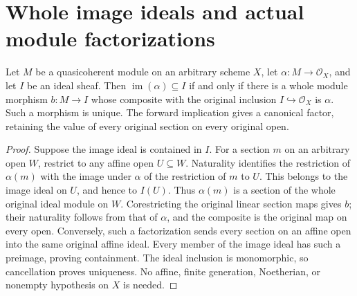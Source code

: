 \section{Whole image ideals and actual module factorizations}

\begin{proposition}
\label{prop:actual-quasicoherent-image-factorization}
Let $M$ be a quasicoherent module on an arbitrary scheme $X$, let
$\alpha:M\to\mathcal O_X$, and let $I$ be an ideal sheaf. Then
$\operatorname{im}(\alpha)\subseteq I$ if and only if there is a whole
module morphism $b:M\to I$ whose composite with the original inclusion
$I\hookrightarrow\mathcal O_X$ is $\alpha$. Such a morphism is unique.
The forward implication gives a canonical factor, retaining the value
of every original section on every original open.
\leanok
\end{proposition}
\begin{proof}
Suppose the image ideal is contained in $I$. For a section $m$ on an
arbitrary open $W$, restrict to any affine open $U\subseteq W$.
Naturality identifies the restriction of $\alpha(m)$ with the image
under $\alpha$ of the restriction of $m$ to $U$. This belongs to the
image ideal on $U$, and hence to $I(U)$. Thus $\alpha(m)$ is a section
of the whole original ideal module on $W$. Corestricting the original
linear section maps gives $b$; their naturality follows from that of
$\alpha$, and the composite is the original map on every open.
Conversely, such a factorization sends every section on an affine open
into the same original affine ideal. Every member of the image ideal
has such a preimage, proving containment. The ideal inclusion is
monomorphic, so cancellation proves uniqueness. No affine, finite
generation, Noetherian, or nonempty hypothesis on $X$ is needed.
\end{proof}
